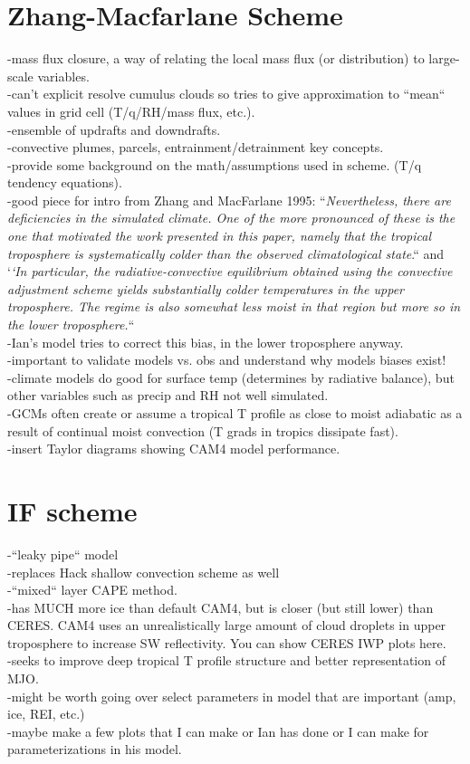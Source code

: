 \documentclass[letterpaper,12pt,titlepage,oneside,final]{book}
\begin{document}
\section{Zhang-Macfarlane Scheme}
-mass flux closure, a way of relating the local mass flux (or distribution) to large-scale variables.
\\
-can't explicit resolve cumulus clouds so tries to give approximation to ``mean`` values in grid cell (T/q/RH/mass flux, etc.).
\\
-ensemble of updrafts and downdrafts.
\\
-convective plumes, parcels, entrainment/detrainment key concepts.
\\
-provide some background on the math/assumptions used in scheme. (T/q tendency equations).
\\
-good piece for intro from Zhang and MacFarlane 1995: ``\textit{Nevertheless, there are deficiencies in the simulated climate. One of the more pronounced of these is the one that motivated the work presented
in this paper, namely that the tropical troposphere is systematically colder than
the observed climatological state}.`` and `\textit{`In particular, the radiative-convective equilibrium obtained using the convective
adjustment scheme yields substantially colder temperatures in the upper
troposphere. The regime is also somewhat less moist in that region but more so in
the lower troposphere.}``
\\
-Ian's model tries to correct this bias, in the lower troposphere anyway.
\\
-important to validate models vs. obs and understand why models biases exist!
\\
-climate models do good for surface temp (determines by radiative balance), but other variables such as precip and RH not well simulated. 
\\
-GCMs often create or assume a tropical T profile as close to moist adiabatic as a result of continual moist convection (T grads in tropics dissipate fast).
\\
-insert Taylor diagrams showing CAM4 model performance.
\section{IF scheme}
-``leaky pipe`` model
\\
-replaces Hack shallow convection scheme as well
\\
-``mixed`` layer CAPE method.
\\
-has MUCH more ice than default CAM4, but is closer (but still lower) than CERES. CAM4 uses an unrealistically large amount of cloud droplets in upper troposphere to increase SW reflectivity. You can show CERES IWP plots here.
\\
-seeks to improve deep tropical T profile structure and better representation of MJO.
\\
-might be worth going over select parameters in model that are important (amp, ice, REI, etc.)
\\
-maybe make a few plots that I can make or Ian has done or I can make for parameterizations in his model.
\\
\end{document}
